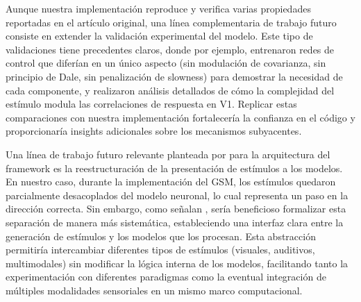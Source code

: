 Aunque nuestra implementación reproduce y verifica varias propiedades reportadas en el artículo original, una línea complementaria de trabajo futuro consiste en extender la validación experimental del modelo. Este tipo de validaciones tiene precedentes claros, donde por ejemplo, \citet{echeveste2020cortical} entrenaron redes de control que diferían en un único aspecto (sin modulación de covarianza, sin principio de Dale, sin penalización de slowness) para demostrar la necesidad de cada componente, y \citet{banyai2019stimulus} realizaron análisis detallados de cómo la complejidad del estímulo modula las correlaciones de respuesta en \acrshort{V1}. Replicar estas comparaciones con nuestra implementación fortalecería la confianza en el código y proporcionaría insights adicionales sobre los mecanismos subyacentes.




Una línea de trabajo futuro relevante planteada por \citeauthor{paredes2025scikit} para la arquitectura del framework es la reestructuración de la presentación de estímulos a los modelos. En nuestro caso, durante la implementación del \acrshort{GSM}, los estímulos quedaron parcialmente desacoplados del modelo neuronal, lo cual representa un paso en la dirección correcta. Sin embargo, como señalan \citet{paredes2025scikit}, sería beneficioso formalizar esta separación de manera más sistemática, estableciendo una interfaz clara entre la generación de estímulos y los modelos que los procesan. Esta abstracción permitiría intercambiar diferentes tipos de estímulos (visuales, auditivos, multimodales) sin modificar la lógica interna de los modelos, facilitando tanto la experimentación con diferentes paradigmas como la eventual integración de múltiples modalidades sensoriales en un mismo marco computacional.


